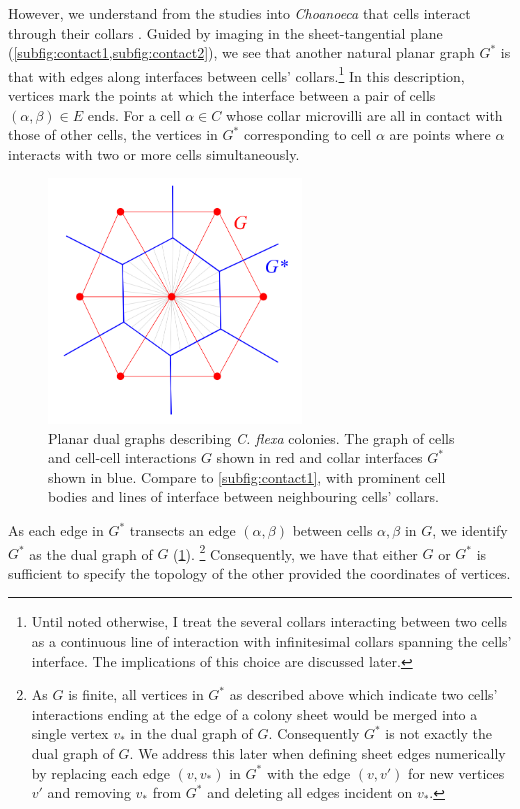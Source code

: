 However, we understand from the studies into \textit{Choanoeca} that cells interact through their collars \citep{ellis1930,leadbeater1983,brunet2019}. 
Guided by imaging in the sheet-tangential plane (\cref{subfig:contact1,subfig:contact2}), we see that another natural planar graph $G^*$ is that with edges along interfaces between cells' collars.\footnote{Until noted otherwise, I treat the several collars interacting between two cells as a continuous line of interaction with infinitesimal collars spanning the cells' interface. The implications of this choice are discussed later.} 
In this description, vertices mark the points at which the interface between a pair of cells $(\alpha, \beta)\in E$ ends. 
For a cell $\alpha\in C$ whose collar microvilli are all in contact with those of other cells, the vertices in $G^*$ corresponding to cell $\alpha$ are points where $\alpha$ interacts with two or more cells simultaneously.

\begin{figure}[htbp]
    \centering
    \includegraphics[width=0.6\textwidth]{duals.png}
    \caption[Planar dual graphs describing \textit{C. flexa} colonies]{Planar dual graphs describing \textit{C. flexa} colonies. The graph of cells and cell-cell interactions $G$ shown in red and collar interfaces $G^*$ shown in blue. Compare to \cref{subfig:contact1}, with prominent cell bodies and lines of interface between neighbouring cells' collars.}
    \label{fig:duals}
\end{figure}

As each edge in $G^*$ transects an edge $(\alpha, \beta)$ between cells $\alpha, \beta$ in $G$, we identify $G^*$ as the dual graph of $G$ (\cref{fig:duals}). \footnote{As $G$ is finite, all vertices in $G^*$ as described above which indicate two cells' interactions ending at the edge of a colony sheet would be merged into a single vertex $v_*$ in the dual graph of $G$. Consequently $G^*$ is not exactly the dual graph of $G$. We address this later when defining sheet edges numerically by replacing each edge $(v, v_*)$ in $G^*$ with the edge $(v, v')$ for new vertices $v'$ and removing $v_*$ from $G^*$ and deleting all edges incident on $v_*$.}
Consequently, we have that either $G$ or $G^*$ is sufficient to specify the topology of the other provided the coordinates of vertices. 

